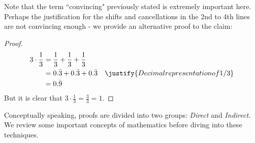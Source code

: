 Note that the term ``convincing" previously stated is extremely important here.
Perhaps the justification for the shifts and cancellations in the 2nd to 4th lines
are not convincing enough - we provide an alternative proof to the claim:
\begin{proof}
  \begin{align}
    3 \cdot \frac{1}{3} &= \frac{1}{3} + \frac{1}{3} + \frac{1}{3} \\
                        &= 0.\bar{3} + 0.\bar{3} + 0.\bar{3} & \justify{Decimal representation of 1/3} \\
                        &= 0.\bar{9}
  \end{align}
  But it is clear that $3 \cdot \frac{1}{3} = \frac{3}{3} = 1$.
\end{proof}

Conceptually speaking, proofs are divided into two groups: \emph{Direct} and \emph{Indirect}.
We review some important concepts of mathematics before diving into these techniques.
